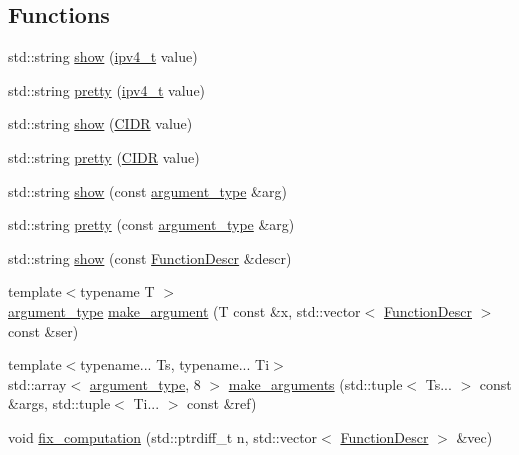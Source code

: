 \subsection*{Functions}
\begin{DoxyCompactItemize}
\item 
std\+::string \hyperlink{namespacepfq_1_1lang_a6b371b706602987f7e45c7558824fa34}{show} (\hyperlink{structpfq_1_1lang_1_1ipv4__t}{ipv4\+\_\+t} value)
\item 
std\+::string \hyperlink{namespacepfq_1_1lang_a7a4c9ec62feae5479366427beeff5b74}{pretty} (\hyperlink{structpfq_1_1lang_1_1ipv4__t}{ipv4\+\_\+t} value)
\item 
std\+::string \hyperlink{namespacepfq_1_1lang_aaa8805ef12da2a39822f13e96197cadd}{show} (\hyperlink{structpfq_1_1lang_1_1CIDR}{C\+I\+DR} value)
\item 
std\+::string \hyperlink{namespacepfq_1_1lang_a980343a34857c5e35e675e8281c0052f}{pretty} (\hyperlink{structpfq_1_1lang_1_1CIDR}{C\+I\+DR} value)
\item 
std\+::string \hyperlink{namespacepfq_1_1lang_a1e54c94175cad1980fc43030d265b58a}{show} (const \hyperlink{structpfq_1_1lang_1_1argument__type}{argument\+\_\+type} \&arg)
\item 
std\+::string \hyperlink{namespacepfq_1_1lang_a2dc4c3535607e668e86aa96674c41eb0}{pretty} (const \hyperlink{structpfq_1_1lang_1_1argument__type}{argument\+\_\+type} \&arg)
\item 
std\+::string \hyperlink{namespacepfq_1_1lang_a7e9458d3c3b90f405ee6df6cbfc43c58}{show} (const \hyperlink{structpfq_1_1lang_1_1FunctionDescr}{Function\+Descr} \&descr)
\item 
{\footnotesize template$<$typename T $>$ }\\\hyperlink{structpfq_1_1lang_1_1argument__type}{argument\+\_\+type} \hyperlink{namespacepfq_1_1lang_ac28f404ec59b7aea311721e0f26b5577}{make\+\_\+argument} (T const \&x, std\+::vector$<$ \hyperlink{structpfq_1_1lang_1_1FunctionDescr}{Function\+Descr} $>$ const \&ser)
\item 
{\footnotesize template$<$typename... Ts, typename... Ti$>$ }\\std\+::array$<$ \hyperlink{structpfq_1_1lang_1_1argument__type}{argument\+\_\+type}, 8 $>$ \hyperlink{namespacepfq_1_1lang_aacc9139aafd72e1f19af3a74c1fdc6dc}{make\+\_\+arguments} (std\+::tuple$<$ Ts... $>$ const \&args, std\+::tuple$<$ Ti... $>$ const \&ref)
\item 
void \hyperlink{namespacepfq_1_1lang_adffac06fa2bba45eca6f8eeab33262d2}{fix\+\_\+computation} (std\+::ptrdiff\+\_\+t n, std\+::vector$<$ \hyperlink{structpfq_1_1lang_1_1FunctionDescr}{Function\+Descr} $>$ \&vec)

\end{DoxyCompactItemize}
